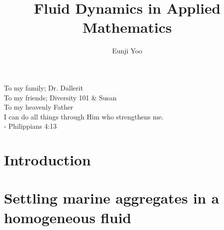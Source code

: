 \documentclass[11pt,oneside,chapterheads]{UCMerced}
\theoremstyle{plain}%
\theoremstyle{definition}
\begin{document}
\title{Fluid Dynamics in Applied Mathematics}
\author{Eunji Yoo}


\begin{frontmatter}
\makefrontmatter %

\tableofcontents
\listoffigures
\listoftables

\begin{dedication}
    To my family; Dr. Dallerit 
    \\
    To my friends; Diversity 101 \& Susan   
    \\
    To my heavenly Father 
    \\
    I can do all things through Him who strengthens me.
    \\
    \hspace{65mm} - Philippians 4:13 
\end{dedication}

\begin{acknowledgements} 
    
\end{acknowledgements}

% 

\begin{abstract}  
    
\end{abstract}

\end{frontmatter}

\chapter{Introduction}
\label{ch:intro}


\chapter{Settling marine aggregates in a homogeneous fluid}
\label{ch:2}

\end{document}
